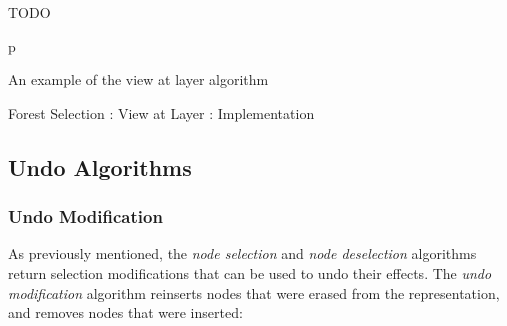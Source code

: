 TODO

\begin{stusubfig}{p}
	\hspace{4mm}%
\caption{An example of the view at layer algorithm}
\label{fig:ipfs-selection-viewatlayer}
\end{stusubfig}

\begin{stulisting}[p]
\caption{Forest Selection : View at Layer : Implementation}
\label{code:ipfs-selection-viewatlayer}

\end{stulisting}

\afterpage{\clearpage}
\newpage

\subsection{Undo Algorithms}

\subsubsection{Undo Modification}

As previously mentioned, the \emph{node selection} and \emph{node deselection} algorithms return selection modifications that can be used to undo their effects. The \emph{undo modification} algorithm reinserts nodes that were erased from the representation, and removes nodes that were inserted:

